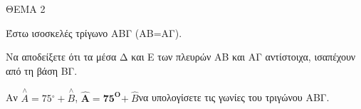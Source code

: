 
ΘΕΜΑ 2

Έστω ισοσκελές τρίγωνο ΑΒΓ (ΑΒ=ΑΓ).

\begin{alist}
\item Να αποδείξετε ότι τα μέσα Δ και Ε των πλευρών ΑΒ και ΑΓ αντίστοιχα, ισαπέχουν από τη βάση ΒΓ. 

\item Αν $\overset{\land}{A} = 75{^\circ} + \overset{\land}{B}$, $\widehat{\mathbf{Α}}\mathbf{=}\mathbf{75}^{\mathbf{Ο}}\mathbf{+ \ }\widehat{Β}$να υπολογίσετε τις γωνίες του τριγώνου ΑΒΓ. 
\end{alist}
